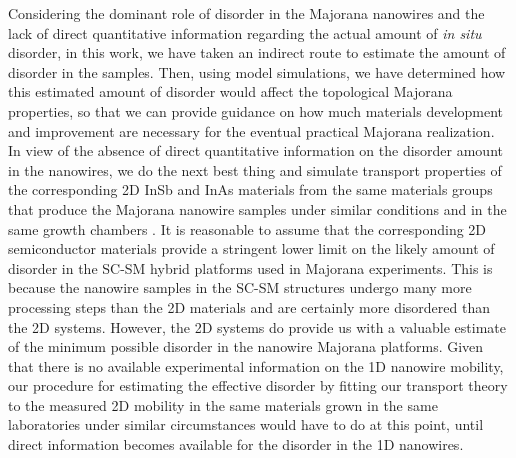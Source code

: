 \documentclass[aps,prmaterials,twocolumn,superscriptaddress,longbibliography]{revtex4-2}
\begin{document}
Considering the dominant role of disorder in the Majorana nanowires and the lack of direct quantitative information regarding the actual amount of \textit{in situ} disorder, in this work, we have taken an indirect route to estimate the amount of disorder in the samples. Then, using model simulations, we have determined how this estimated amount of disorder would affect the topological Majorana properties, so that we can provide guidance on how much materials development and improvement are necessary for the eventual practical Majorana realization. 
 In view of the absence of direct quantitative information on the disorder amount in the nanowires, we do the next best thing and simulate transport properties of the corresponding 2D InSb and InAs materials from the same materials groups that produce the Majorana nanowire samples under similar conditions and in the same growth chambers \cite{gazibegovic2019bottomup, pauka2020repairing, beznasyuk2021role}.  It is reasonable to assume that the corresponding 2D semiconductor materials provide a stringent lower limit on the likely amount of disorder in the SC-SM hybrid platforms used in Majorana experiments.  This is because the nanowire samples in the SC-SM structures undergo many more processing steps than the 2D materials and are certainly more disordered than the 2D systems. However, the 2D systems do provide us with a valuable estimate of the minimum possible disorder in the nanowire Majorana platforms.  Given that there is no available experimental information on the 1D nanowire mobility, our procedure for estimating the effective disorder by fitting our transport theory to the measured 2D mobility in the same materials grown in the same laboratories under similar circumstances would have to do at this point, until direct information becomes available for the disorder in the 1D nanowires.
\end{document}
